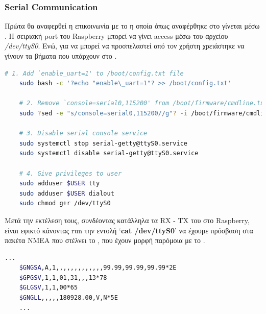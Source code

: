 \subsubsection{Serial Communication}
Πρώτα θα αναφερθεί η επικοινωνία με το  η οποία όπως αναφέρθηκε στο  γίνεται μέσω . Η σειριακή port του Raspberry μπορεί να γίνει access μέσω του αρχείου \textit{/dev/ttyS0}. Ενώ, για να μπορεί να προσπελαστεί από τον χρήστη χρειάστηκε να γίνουν τα βήματα \cite{serial-fix} που υπάρχουν στο .
\newpage

\begin{lstlisting}[language=bash, escapechar=?, caption={Fix serial communication},label=list:fix-serial-communication]
    # 1. Add `enable_uart=1' to /boot/config.txt file
    sudo bash -c '?echo "enable\_uart=1"? >> /boot/config.txt'

    # 2. Remove `console=serial0,115200' from /boot/firmware/cmdline.txt
    sudo ?sed -e "s/console=serial0,115200//g"? -i /boot/firmware/cmdline.txt

    # 3. Disable serial console service
    sudo systemctl stop serial-getty@ttyS0.service
    sudo systemctl disable serial-getty@ttyS0.service

    # 4. Give privileges to user
    sudo adduser $USER tty
    sudo adduser $USER dialout
    sudo chmod g+r /dev/ttyS0
\end{lstlisting}

Μετά την εκτέλεση τους, συνδέοντας κατάλληλα τα RX - TX του  στο Ra\-spbe\-rry, είναι εφικτό κάνοντας run την εντολή `\textbf{cat /dev/ttyS0}' να έχουμε πρόσβαση στα πακέτα NMEA που στέλνει το , που έχουν μορφή παρόμοια με το .

\begin{lstlisting}[language=bash, escapechar=@, caption={Serial Output, NMEA packets example},label=list:serial-output]
    ...
    $GNGSA,A,1,,,,,,,,,,,,,99.99,99.99,99.99*2E
    $GPGSV,1,1,01,31,,,13*78
    $GLGSV,1,1,00*65
    $GNGLL,,,,,180928.00,V,N*5E
    ...
\end{lstlisting}

